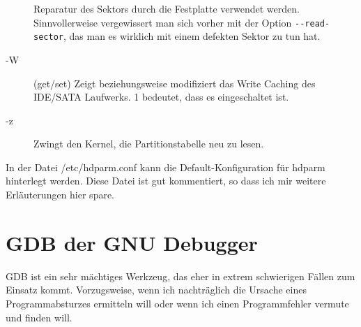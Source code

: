 \begin{normaltext}
\begin{description}
      Reparatur des Sektors durch die Festplatte verwendet werden.
      Sinnvollerweise vergewissert man sich vorher mit der Option
      \verb?--read-sector?, das man es wirklich mit einem defekten Sektor zu
      tun hat.
    \item[-W] (get/set) Zeigt beziehungsweise modifiziert das Write Caching
      des IDE/SATA Laufwerks. 1 bedeutet, dass es eingeschaltet ist.
    \item[-z] Zwingt den Kernel, die Partitionstabelle neu zu lesen.
  \end{description}
  In der Datei /etc/hdparm.conf kann die Default-Konfiguration für hdparm
  hinterlegt werden. Diese Datei ist gut kommentiert, so dass ich mir weitere
  Erläuterungen hier spare.
\end{normaltext}

\section{GDB der GNU Debugger}
\label{sec:lokal-werkzeuge-gdb}
\begin{abstractsec}
  GDB ist ein sehr mächtiges Werkzeug, das eher in extrem schwierigen Fällen
  zum Einsatz kommt. Vorzugsweise, wenn ich nachträglich die Ursache eines
  Programmabsturzes ermitteln will oder wenn ich einen Programmfehler vermute
  und finden will.
\end{abstractsec}
